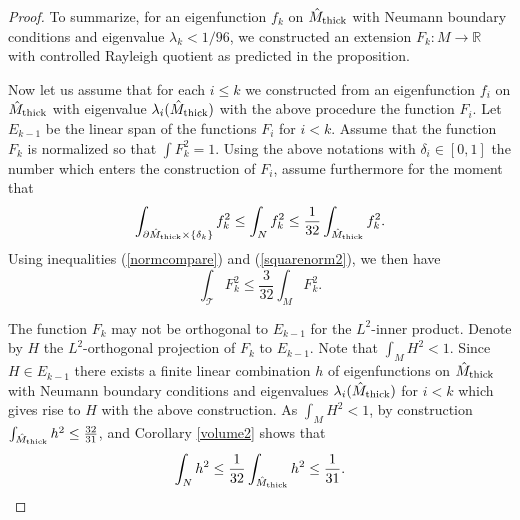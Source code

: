 \documentclass[11pt]{amsart}
\theoremstyle{plain}
\theoremstyle{plain}
\theoremstyle{definition}
\newcommand{\cal}{\mathcal}
\begin{document}
\begin{proof}
To summarize, for an eigenfunction $f_k$ on $\hat M_{\rm thick}$
with Neumann boundary conditions and eigenvalue
$\lambda_k<1/96$, we constructed an extension $F_k:M\to \mathbb{R}$
with controlled Rayleigh quotient as predicted in the proposition.


Now let us assume that for each $i\leq k$ we constructed from an 
eigenfunction $f_i$ on $\hat M_{\rm thick}$ with eigenvalue $\lambda_i(\hat M_{\rm thick})$
with the above procedure the function $F_i$. 
Let $E_{k-1}$ be the linear span of the functions
$F_i$ for $i<k$. Assume that the function $F_k$ is normalized 
so that $\int F_k^2=1$. Using the above notations with $\delta_i\in [0,1]$
the number which enters the construction of $F_i$, 
assume furthermore for the moment
that 
\begin{equation}\label{integralestimate}
\int_{\partial \hat M_{\rm thick}\times \{\delta_k\}}f_k^2\leq 
\int_Nf_k^2\leq \frac{1}{32}\int_{\hat M_{\rm thick}}f_k^2.
\end{equation}
Using inequalities (\ref{normcompare}) and (\ref{squarenorm2}), we then
have 
\[\int_{\cal T}F_k^2\leq \frac{3}{32}\int_M F_k^2.\]

The function $F_k$ may not be orthogonal to $E_{k-1}$ for the 
$L^2$-inner product. Denote by $H$ the $L^2$-orthogonal 
projection of $F_k$ to $E_{k-1}$.
Note that $\int_M H^2<1$. 
%
Since $H\in E_{k-1}$ there exists a finite linear combination 
$h$
of eigenfunctions on $\hat M_{\rm thick}$ with
Neumann boundary conditions and eigenvalues $\lambda_i(\hat M_{\rm thick})$ 
for $i<k$ 
which gives rise to $H$
with the above construction. As $\int_M H^2<1$, by construction 
 $\int_{\hat M_{\rm thick}} h^2\leq \frac{32}{31}$, and 
Corollary \ref{volume2} shows that
\[\int_Nh^2\leq \frac{1}{32}\int_{\hat M_{\rm thick}}h^2
\leq \frac{1}{31}.\]


\end{proof}
\end{document}
